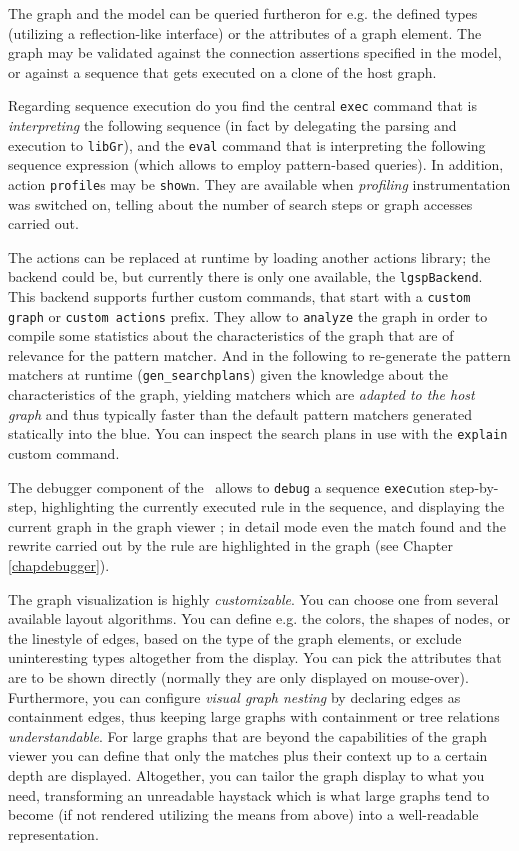 The graph and the model can be queried furtheron for e.g. the defined types (utilizing a reflection-like interface) or the attributes of a graph element.
The graph may be validated against the connection assertions specified in the model, or against a sequence that gets executed on a clone of the host graph.

Regarding sequence execution do you find the central \texttt{exec} command that is \emph{interpreting} the following sequence (in fact by delegating the parsing and execution to \texttt{libGr}), and the \texttt{eval} command that is interpreting the following sequence expression (which allows to employ pattern-based queries).
In addition, action \texttt{profile}s may be \texttt{show}n.
They are available when \emph{profiling} instrumentation was switched on, telling about the number of search steps or graph accesses carried out.

The actions can be replaced at runtime by loading another actions library; the backend could be, but currently there is only one available, the \texttt{lgspBackend}.
This backend supports further custom commands, that start with a \texttt{custom graph} or \texttt{custom actions} prefix. 
They allow to \texttt{analyze} the graph in order to compile some statistics about the characteristics of the graph that are of relevance for the pattern matcher.
And in the following to re-generate the pattern matchers at runtime (\texttt{gen\_searchplans}) given the knowledge about the characteristics of the graph, yielding matchers which are \emph{adapted to the host graph} and thus typically faster than the default pattern matchers generated statically into the blue.
You can inspect the search plans in use with the \texttt{explain} custom command.

The debugger component of the \GrShell\ allows to \texttt{debug} a sequence \texttt{exec}ution step-by-step, highlighting the currently executed rule in the sequence, and displaying the current graph in the graph viewer \yComp;
in detail mode even the match found and the rewrite carried out by the rule are highlighted in the graph (see Chapter \ref{chapdebugger}).

The graph visualization is highly \emph{customizable}.
You can choose one from several available layout algorithms.
You can define e.g. the colors, the shapes of nodes, or the linestyle of edges, based on the type of the graph elements,
or exclude uninteresting types altogether from the display.
You can pick the attributes that are to be shown directly (normally they are only displayed on mouse-over).
Furthermore, you can configure \emph{visual graph nesting} by declaring edges as containment edges, thus keeping large graphs with containment or tree relations \emph{understandable}.
For large graphs that are beyond the capabilities of the graph viewer you can define that only the matches plus their context up to a certain depth are displayed.
Altogether, you can tailor the graph display to what you need, transforming an unreadable haystack which is what large graphs tend to become (if not rendered utilizing the means from above) into a well-readable representation.


